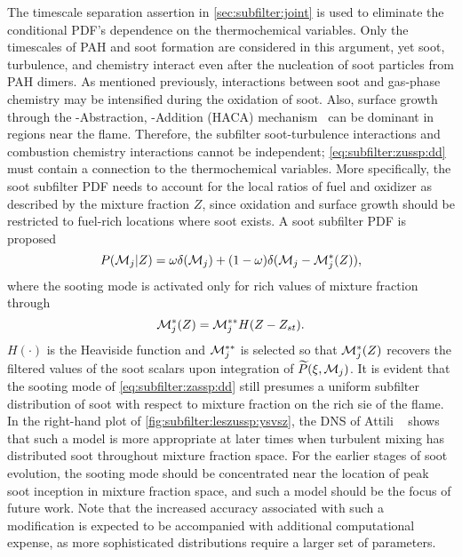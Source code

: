 The timescale separation assertion in \cref{sec:subfilter:joint} is used to eliminate the conditional PDF's dependence on the thermochemical variables. Only the timescales of PAH and soot formation are considered in this argument, yet soot, turbulence, and chemistry interact even after the nucleation of soot particles from PAH dimers. As mentioned previously, interactions between soot and gas-phase chemistry may be intensified during the oxidation of soot. Also, surface growth through the -Abstraction, -Addition (HACA) mechanism~\cite{frenklach1985,frenklach1991} can be dominant in regions near the flame. Therefore, the subfilter soot-turbulence interactions and combustion chemistry interactions cannot be independent; \cref{eq:subfilter:zussp:dd} must contain a connection to the thermochemical variables. More specifically, the soot subfilter PDF needs to account for the local ratios of fuel and oxidizer as described by the mixture fraction $Z$, since oxidation and surface growth should be restricted to fuel-rich locations where soot exists. A soot subfilter PDF is proposed
\begin{equation}\label{eq:subfilter:zassp:dd}
  P(\mathcal{M}_j|Z) = \omega\delta(\mathcal{M}_j) + (1 - \omega)\delta(\mathcal{M}_j - \mathcal{M}_j^*(Z)),
\end{equation}
where the sooting mode is activated only for rich values of mixture fraction through
\begin{equation}\label{eq:subfilter:zassp:mstar}
  \mathcal{M}_j^*(Z) = \mathcal{M}_j^{**}H(Z - Z_{st}).
\end{equation}
$H(\cdot)$ is the Heaviside function and $\mathcal{M}_j^{**}$ is selected so that $\mathcal{M}_j^*(Z)$ recovers the filtered values of the soot scalars upon integration of $\widetilde{P}(\xi,\mathcal{M}_j)$. It is evident that the sooting mode of \cref{eq:subfilter:zassp:dd} still presumes a uniform subfilter distribution of soot with respect to mixture fraction on the rich sie of the flame. In the right-hand plot of \cref{fig:subfilter:leszussp:ysvsz}, the DNS of Attili \etal~\cite{attili2014} shows that such a model is more appropriate at later times when turbulent mixing has distributed soot throughout mixture fraction space. For the earlier stages of soot evolution, the sooting mode should be concentrated near the location of peak soot inception in mixture fraction space, and such a model should be the focus of future work. Note that the increased accuracy associated with such a modification is expected to be accompanied with additional computational expense, as more sophisticated distributions require a larger set of parameters.

